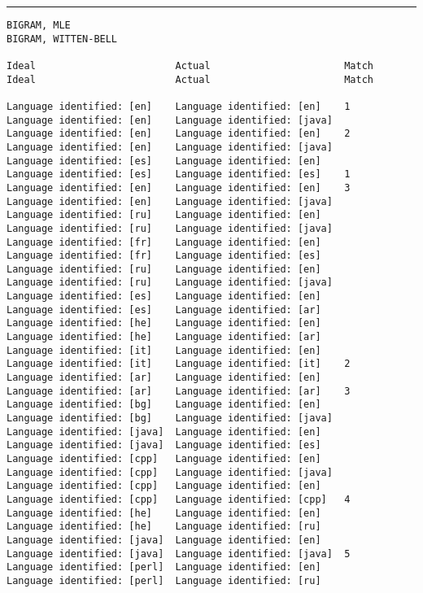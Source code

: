 \tiny
\hrule\vskip4pt
\begin{verbatim}
BIGRAM, MLE                                                        BIGRAM, WITTEN-BELL

Ideal                        Actual                       Match    Ideal                        Actual                       Match

Language identified: [en]    Language identified: [en]    1        Language identified: [en]    Language identified: [java]
Language identified: [en]    Language identified: [en]    2        Language identified: [en]    Language identified: [java]
Language identified: [es]    Language identified: [en]             Language identified: [es]    Language identified: [es]    1
Language identified: [en]    Language identified: [en]    3        Language identified: [en]    Language identified: [java]
Language identified: [ru]    Language identified: [en]             Language identified: [ru]    Language identified: [java]
Language identified: [fr]    Language identified: [en]             Language identified: [fr]    Language identified: [es]
Language identified: [ru]    Language identified: [en]             Language identified: [ru]    Language identified: [java]
Language identified: [es]    Language identified: [en]             Language identified: [es]    Language identified: [ar]
Language identified: [he]    Language identified: [en]             Language identified: [he]    Language identified: [ar]
Language identified: [it]    Language identified: [en]             Language identified: [it]    Language identified: [it]    2
Language identified: [ar]    Language identified: [en]             Language identified: [ar]    Language identified: [ar]    3
Language identified: [bg]    Language identified: [en]             Language identified: [bg]    Language identified: [java]
Language identified: [java]  Language identified: [en]             Language identified: [java]  Language identified: [es]
Language identified: [cpp]   Language identified: [en]             Language identified: [cpp]   Language identified: [java]
Language identified: [cpp]   Language identified: [en]             Language identified: [cpp]   Language identified: [cpp]   4
Language identified: [he]    Language identified: [en]             Language identified: [he]    Language identified: [ru]
Language identified: [java]  Language identified: [en]             Language identified: [java]  Language identified: [java]  5
Language identified: [perl]  Language identified: [en]             Language identified: [perl]  Language identified: [ru]

\end{verbatim}
